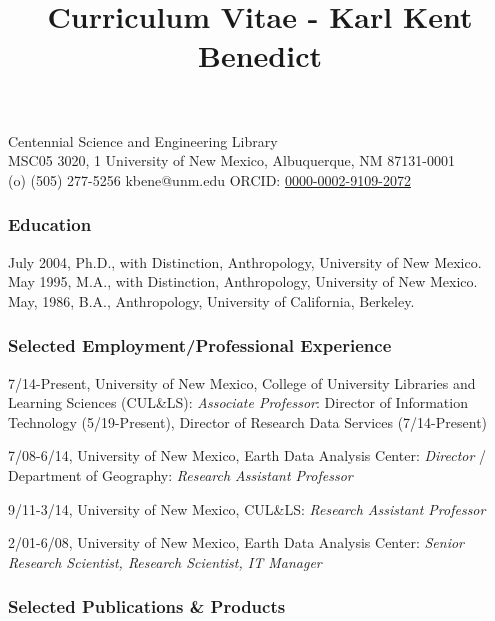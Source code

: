 \documentclass[]{article}
\title{Curriculum Vitae - Karl Kent Benedict}
\begin{document}
\thetitle %

Centennial Science and Engineering Library\\
MSC05 3020, 1 University of New Mexico, Albuquerque, NM 87131-0001\\
(o) (505) 277-5256 \textbar{} kbene@unm.edu \textbar{} ORCID:
\href{https://orcid.org/0000-0002-9109-2072}{0000-0002-9109-2072}

\hypertarget{education}{%
\subsubsection{Education}\label{education}}

July 2004, Ph.D., with Distinction, Anthropology, University of New
Mexico.\\
May 1995, M.A., with Distinction, Anthropology, University of New
Mexico.\\
May, 1986, B.A., Anthropology, University of California, Berkeley.

\hypertarget{selected-employmentprofessional-experience}{%
\subsubsection{Selected Employment/Professional
Experience}\label{selected-employmentprofessional-experience}}

7/14-Present, University of New Mexico, College of University Libraries
and Learning Sciences (CUL\&LS): \emph{Associate Professor}: Director of
Information Technology (5/19-Present), Director of Research Data
Services (7/14-Present)

7/08-6/14, University of New Mexico, Earth Data Analysis Center:
\emph{Director} / Department of Geography: \emph{Research Assistant
Professor}

9/11-3/14, University of New Mexico, CUL\&LS: \emph{Research Assistant
Professor}

2/01-6/08, University of New Mexico, Earth Data Analysis Center:
\emph{Senior Research Scientist, Research Scientist, IT Manager}

\hypertarget{selected-publications-products}{%
\subsubsection{Selected Publications \&
Products}\label{selected-publications-products}}
\end{document}
